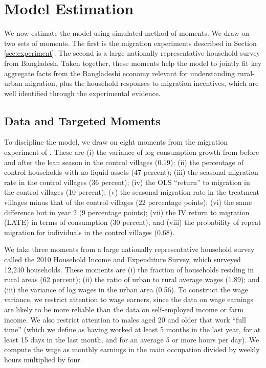 \documentclass[12pt,pdftex]{article}
\begin{document}
\section{Model Estimation} \label{sec:estimation}

We now estimate the model using simulated method of moments. We draw on two sets of moments. The first is the migration experiments described in Section \ref{sec:experiment}. The second is a large nationally representative household survey from Bangladesh. Taken together, these moments help the model to jointly fit key aggregate facts from the Bangladeshi economy relevant for understanding rural-urban migration, plus the household responses to migration incentives, which are well identified through the experimental evidence.

\subsection{Data and Targeted Moments}

To discipline the model, we draw on eight moments from the migration experiment of \citet{brch14}. These are (i) the variance of log consumption growth from before and after the lean season in the control villages (0.19); (ii) the percentage of control households with no liquid assets (47 percent); (iii) the seasonal migration rate in the control villages (36 percent); (iv) the OLS ``return'' to migration in the control villages (10 percent); (v) the seasonal migration rate in the treatment villages minus that of the control villages (22 percentage points); (vi) the same difference but in year 2 (9 percentage points); (vii) the IV return to migration (LATE) in terms of consumption (30 percent); and (viii) the probability of repeat migration for individuals in the control villages (0.68).

We take three moments from a large nationally representative household survey called the 2010 Household Income and Expenditure Survey, which surveyed 12,240 households. These moments are (i) the fraction of households residing in rural areas (62 percent); (ii) the ratio of urban to rural average wages (1.89); and (iii) the variance of log wages in the urban area (0.56). To construct the wage variance, we restrict attention to wage earners, since the data on wage earnings are likely to be more reliable than the data on self-employed income or farm income. We also restrict attention to males aged 20 and older that work ``full time'' (which we define as having worked at least 5 months in the last year, for at least 15 days in the last month, and for an average 5 or more hours per day). We compute the wage as monthly earnings in the main occupation divided by weekly hours multiplied by four.
\end{document}
